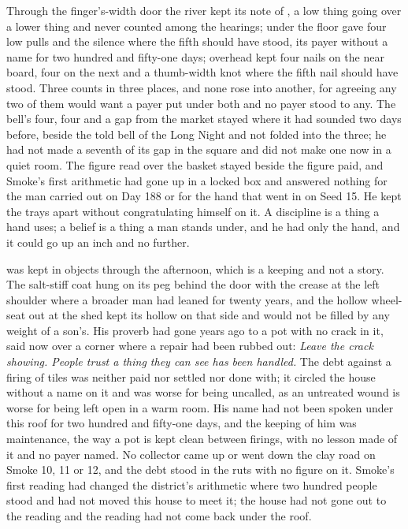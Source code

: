 Through the finger's-width door the river kept its note of , a low thing going over a lower thing and never counted among the hearings; under the floor  gave four low pulls and the silence where the fifth should have stood, its payer without a name for two hundred and fifty-one days; overhead  kept four nails on the near board, four on the next and a thumb-width knot where the fifth nail should have stood. Three counts in three places, and none rose into another, for agreeing any two of them would want a payer put under both and no payer stood to any. The bell's four, four and a gap from the market stayed where it had sounded two days before, beside the told bell of the Long Night and not folded into the three; he had not made a seventh of its gap in the square and did not make one now in a quiet room. The figure read over the basket stayed beside the figure paid, and Smoke's first arithmetic had gone up  in a locked box and answered nothing for the man carried out on Day 188 or for the hand that went in on Seed 15. He kept the trays apart without congratulating himself on it. A discipline is a thing a hand uses; a belief is a thing a man stands under, and he had only the hand, and it could go up an inch and no further.

\scenebreak

 was kept in objects through the afternoon, which is a keeping and not a story. The salt-stiff coat hung on its peg behind the door with the crease at the left shoulder where a broader man had leaned for twenty years, and the hollow wheel-seat out at the shed kept its hollow on that side and would not be filled by any weight of a son's. His proverb had gone years ago to a pot with no crack in it, said now over a corner where a repair had been rubbed out: \emph{Leave the crack showing. People trust a thing they can see has been handled.} The debt against a firing of tiles was neither paid nor settled nor done with; it circled the house without a name on it and was worse for being uncalled, as an untreated wound is worse for being left open in a warm room. His name had not been spoken under this roof for two hundred and fifty-one days, and the keeping of him was maintenance, the way a pot is kept clean between firings, with no lesson made of it and no payer named. No collector came up or went down the clay road on Smoke 10, 11 or 12, and the debt stood in the ruts with no figure on it. Smoke's first reading had changed the district's arithmetic where two hundred people stood and had not moved this house to meet it; the house had not gone out to the reading and the reading had not come back under the roof.

